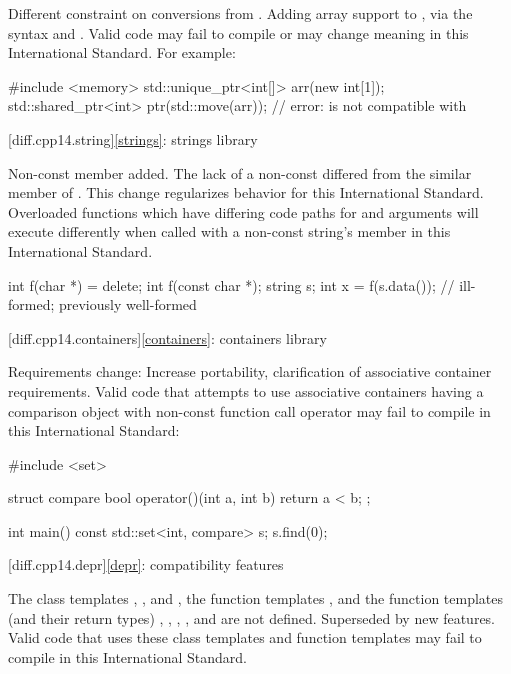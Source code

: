 \change
Different constraint on conversions from .
\rationale
Adding array support to ,
via the syntax  and .
\effect
Valid \CppXIV{} code may fail to compile or may change meaning in this
International Standard.
For example:
\begin{codeblock}
#include <memory>
std::unique_ptr<int[]> arr(new int[1]);
std::shared_ptr<int> ptr(std::move(arr));   // error:  is not compatible with 
\end{codeblock}

[diff.cpp14.string]{\ref{strings}: strings library}

\change
Non-const  member added.
\rationale
The lack of a non-const 
differed from the similar member of .
This change regularizes behavior for this International Standard.
\effect
Overloaded functions which have differing code paths
for  and  arguments
will execute differently
when called with a non-const string's  member
in this International Standard.

\begin{codeblock}
int f(char *) = delete;
int f(const char *);
string s;
int x = f(s.data());            // ill-formed; previously well-formed
\end{codeblock}

[diff.cpp14.containers]{\ref{containers}: containers library}

\change
Requirements change:
\rationale
Increase portability, clarification of associative container requirements.
\effect
Valid \CppXIV{} code that attempts to use associative containers
having a comparison object with non-const function call operator
may fail to compile in this International Standard:
\begin{codeblock}
#include <set>

struct compare
{
  bool operator()(int a, int b)
  {
    return a < b;
  }
};

int main() {
  const std::set<int, compare> s;
  s.find(0);
}
\end{codeblock}

[diff.cpp14.depr]{\ref{depr}: compatibility features}

\nodiffref
\change
The class templates
,
, and
,
the function templates
,
and the function templates (and their return types)
,
,
,
, and
are not defined.
\rationale
Superseded by new features.
\effect
Valid \CppXIV{} code that uses these class templates
and function templates may fail to compile in this International Standard.

